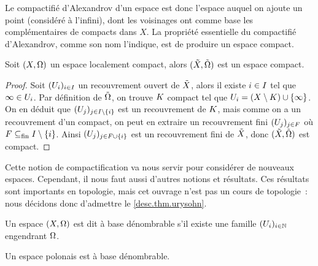 Le compactifié d'Alexandrov d'un espace est donc l'espace auquel on ajoute un
point (considéré à l'infini), dont les voisinages ont comme base les
complémentaires de compacts dans $X$. La propriété essentielle du compactifié
d'Alexandrov, comme son nom l'indique, est de produire un espace compact.

\begin{proposition}
  Soit $(X,\Omega)$ un espace localement compact, alors
  $(\tilde{X},\tilde{\Omega})$ est un espace compact.
\end{proposition}

\begin{proof}
  Soit $(U_i)_{i\in I}$ un recouvrement ouvert de $\tilde{X}$, alors il
  existe $i\in I$ tel que $\infty\in U_i$. Par définition de
  $\tilde{\Omega}$, on trouve $K$ compact tel que
  $U_i=(X\setminus K)\cup\{\infty\}$.
  On en déduit que $(U_j)_{j\in I\setminus\{i\}}$ est un recouvrement de
  $K$, mais comme on a un recouvrement d'un compact, on peut en extraire un
  recouvrement fini $(U_j)_{j\in F}$ où $F\subseteq_{\mathrm{fin}} I\setminus\{i\}$.
  Ainsi $(U_j)_{j\in F\cup \{i\}}$ est un recouvrement fini de $\tilde{X}$,
  donc $(\tilde{X},\tilde{\Omega})$ est compact.
\end{proof}

Cette notion de compactification va nous servir pour considérer de nouveaux
espaces. Cependant, il nous faut aussi d'autres notions et résultats. Ces
résultats sont importants en topologie, mais cet ouvrage n'est pas un cours de
topologie~: nous décidons donc d'admettre le \cref{desc.thm.urysohn}.

\begin{definition}
  Un espace $(X,\Omega)$ est dit à base dénombrable s'il existe une famille
  $(U_i)_{i\in\mathbb N}$ engendrant $\Omega$.
\end{definition}

\begin{proposition}\label{prop.base.denomb}
  Un espace polonais est à base dénombrable.
\end{proposition}

